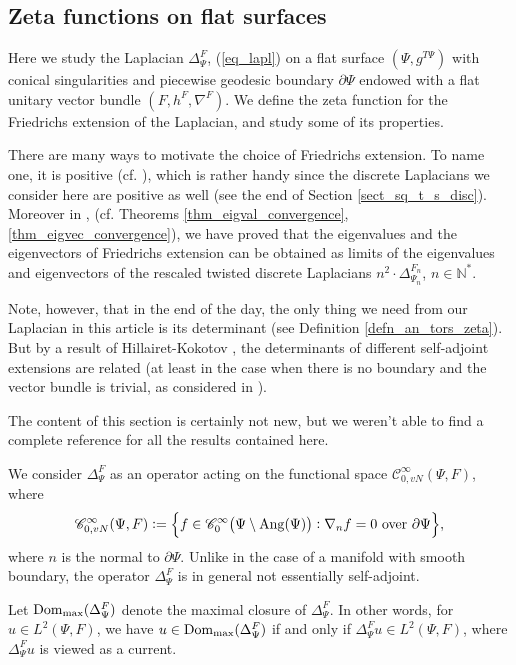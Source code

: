 \documentclass[12pt]{article}
\numberwithin{equation}{section}
\theoremstyle{theorem}
\theoremstyle{definition}
\theoremstyle{remark}
\newcommand{\nat}{\mathbb{N}}
\newcommand{\ccal}{\mathscr{C}}
\newcommand{\laplcomp}{\Delta}
\begin{document}
	\subsection{Zeta functions on flat surfaces}\label{sect_zeta_flat_fun}
		Here we study the Laplacian $\laplcomp_{\Psi}^{F}$, (\ref{eq_lapl}) on a flat surface $(\Psi, g^{T \Psi})$ with conical singularities and piecewise geodesic boundary $\partial \Psi$ endowed with a flat unitary vector bundle $(F, h^F, \nabla^F)$. 
		We define the zeta function for the Friedrichs extension of the Laplacian, and study some of its properties.
		\par There are many ways to motivate the choice of Friedrichs extension. To name one, it is positive (cf. \cite[Theorem X.23]{ReedSimonII}), which is rather handy since the discrete Laplacians we consider here are positive as well (see the end of Section \ref{sect_sq_t_s_disc}). 
	Moreover in \cite{FinFinDiffer}, (cf. Theorems \ref{thm_eigval_convergence}, \ref{thm_eigvec_convergence}), we have proved that the eigenvalues and the eigenvectors of Friedrichs extension can be obtained as limits of the eigenvalues and eigenvectors of the rescaled twisted discrete Laplacians $n^2 \cdot \laplcomp_{\Psi_n}^{F_n}$, $n \in \nat^*$.
	\par Note, however, that in the end of the day, the only thing we need from our Laplacian in this article is its determinant (see Definition \ref{defn_an_tors_zeta}). 
	But by a result of Hillairet-Kokotov \cite[Theorem 1]{HilKok}, the determinants of different self-adjoint extensions are related (at least in the case when there is no boundary and the vector bundle is trivial, as considered in \cite{HilKok}).
		\par 
		The content of this section is certainly not new, but we weren't able to find a complete reference for all the results contained here.
		\par
		We consider $\laplcomp_{\Psi}^{F}$ as an operator acting on the functional space $\ccal^{\infty}_{0, vN}(\Psi, F)$, where
		\begin{equation}
			\ccal^{\infty}_{0, vN}(\Psi, F) := \Big\{ f \in \ccal^{\infty}_{0} \big(\Psi \setminus {\rm{Ang}(\Psi)} \big) : \nabla_n f = 0 \text{ over } \partial \Psi \Big\},
		\end{equation}	
		where $n$ is the normal to $\partial \Psi$.
		Unlike in the case of a manifold with smooth boundary, the operator $\laplcomp_{\Psi}^{F}$ is in general not essentially self-adjoint.
		\par 
		Let ${\rm{Dom}}_{\max}(\laplcomp_{\Psi}^{F})$ denote the maximal closure of $\laplcomp_{\Psi}^{F}$. In other words, for $u \in L^2(\Psi, F)$, we have $u \in {\rm{Dom}}_{\max}(\laplcomp_{\Psi}^{F})$ if and only if $\laplcomp_{\Psi}^{F} u \in L^2(\Psi, F)$, where $\laplcomp_{\Psi}^{F} u$ is viewed as a current.
\end{document}
